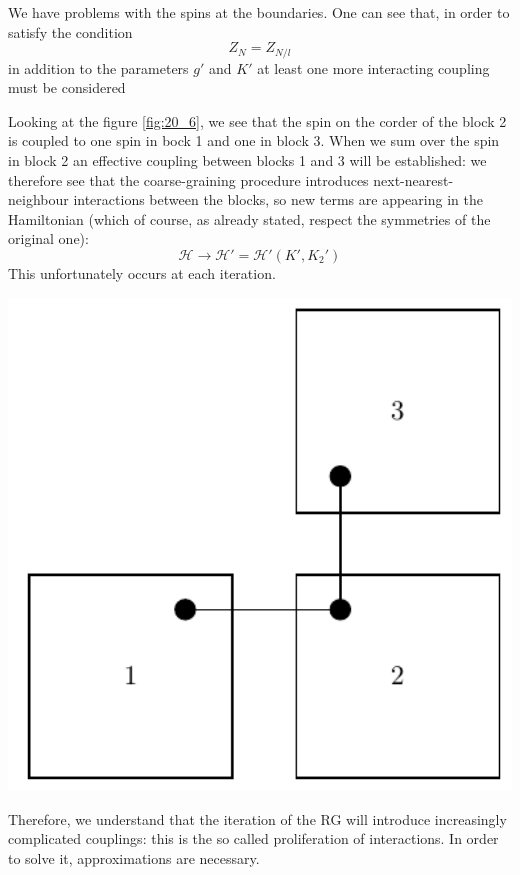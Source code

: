 \documentclass[../../Main/Main.tex]{subfiles}
\begin{document}
We have problems with the spins at the boundaries. One can see that, in order to satisfy the condition
\begin{equation*}
  Z_N = Z_{N/l}
\end{equation*}
in addition to the parameters \( g' \) and \( K' \) at least one more interacting coupling must be considered

\begin{minipage}[c]{0.6\linewidth}
  \vspace{0.3cm}
Looking at the figure \ref{fig:20_6}, we see that the spin on the corder of the block 2 is coupled to one spin in bock 1 and one in block 3. When we sum over the spin in block 2 an effective coupling between blocks 1 and 3 will be established: we therefore see that the coarse-graining procedure introduces next-nearest-neighbour interactions between the blocks, so new terms are appearing in the Hamiltonian (which of course, as already stated, respect the symmetries of the original one):
\begin{equation*}
  \mathcal{H} \rightarrow \mathcal{H}' = \mathcal{H}' (K',K_2')
\end{equation*}
This unfortunately occurs at each iteration.
  \vspace{0.3cm}
\end{minipage}
\hspace{0.02\linewidth}
\begin{minipage}[]{0.35\linewidth}
\centering
\includegraphics[width=1\textwidth]{./img/6.pdf}
\end{minipage}
Therefore, we understand that the iteration of the RG will introduce increasingly complicated couplings: this is the so called proliferation of interactions. In order to solve it, approximations are necessary.
\end{document}
